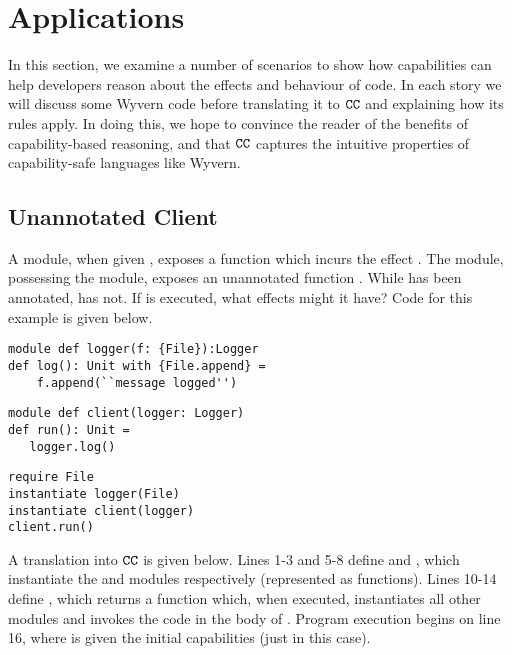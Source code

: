 \section{Applications}
\label{s:app}

In this section, we examine a number of scenarios to show how capabilities can help
developers reason about the effects and behaviour of code. In each story we will
discuss some Wyvern code before translating it to $\mathtt{CC}$ and explaining how its
rules apply. In doing this, we hope to convince the reader of the benefits of
capability-based reasoning, and that $\mathtt{CC}$ captures the intuitive properties of
capability-safe languages like Wyvern.

\subsection{Unannotated Client}
\label{s:unann-client}

A  module, when given , exposes a  function
which incurs the effect . The  module, possessing the
 module, exposes an unannotated function . While
 has been annotated,  has not. If  is
executed, what effects might it have? Code for this example is given below. 

\begin{lstlisting}
module def logger(f: {File}):Logger
def log(): Unit with {File.append} =
    f.append(``message logged'')
\end{lstlisting}

\begin{lstlisting}
module def client(logger: Logger)
def run(): Unit =
   logger.log()
\end{lstlisting}

\begin{lstlisting}
require File
instantiate logger(File)
instantiate client(logger)
client.run()
\end{lstlisting}

A translation into $\mathtt{CC}$ is given below. Lines 1-3 and 5-8 define
 and , which instantiate the  and
 modules respectively (represented as functions). Lines 10-14 define
, which returns a function which, when executed, instantiates all
other modules and invokes the code in the body of . Program execution
begins on line 16, where  is given the initial capabilities (just 
in this case).

